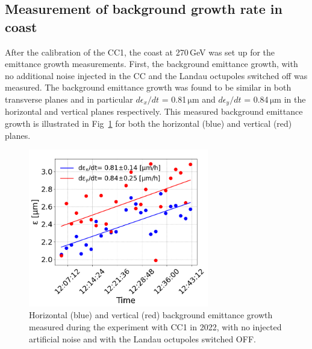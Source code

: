 \subsection{Measurement of background growth rate in coast}\label{subsec:measured_background_growth_cc_md_2022}
After the calibration of the CC1, the coast at 270\,GeV was set up for the emittance growth measurements. First, the background emittance growth, with no additional noise injected in the CC and the Landau octupoles switched off was measured. The background emittance growth was found to be similar in both transverse planes and in particular $d\epsilon_x /dt$ = 0.81\,$\mathrm{\mu m}$ and $d\epsilon_y /dt$ = 0.84\,$\mathrm{\mu m}$ in the horizontal and vertical planes respectively. This measured background emittance growth is illustrated in Fig~\ref{fig:cc_md_2022_background_growth_in_scan} for both the horizontal (blue) and vertical (red) planes.

\begin{figure}[!h] %
   \centering         
   \includegraphics[width=0.7\textwidth]{images/Ch8/cc_md_2022_background_in_scan.png}
       \caption{Horizontal (blue) and vertical (red) background emittance growth measured during the experiment with CC1 in 2022, with no injected artificial noise and with the Landau octupoles switched OFF.}
       \label{fig:cc_md_2022_background_growth_in_scan}
\end{figure}

